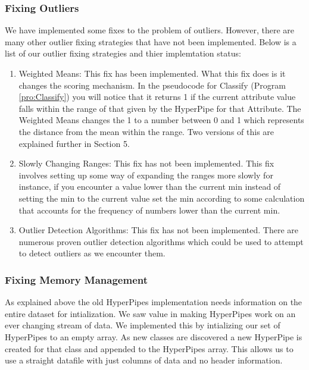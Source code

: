 \subsubsection{Fixing Outliers}
We have implemented some fixes to the problem of outliers. 
However, there are many other outlier fixing strategies that have 
not been implemented. Below is a list of our outlier fixing 
strategies and thier implemtation status:
\begin{enumerate}
\item Weighted Means: This fix has been implemented. What this fix 
does is it changes the scoring mechanism. In the pseudocode for 
Classify (Program \ref{pro:Classify}) you will notice that it returns 1 if the current attribute 
value falls within the range of that given by the HyperPipe for that 
Attribute. The Weighted Means changes the 1 to a number between 0 
and 1 which represents the distance from the mean within the range. 
Two versions of this are explained further in Section 5.
\item Slowly Changing Ranges: This fix has not been implemented. 
This fix involves setting up some way of expanding the ranges more 
slowly for instance, if you encounter a value lower than the current 
min instead of setting the min to the current value set the min 
according to some calculation that accounts for the frequency of 
numbers lower than the current min.
\item Outlier Detection Algorithms: This fix has not been implemented. 
There are numerous proven outlier detection algorithms which could be 
used to attempt to detect outliers as we encounter them.
\end{enumerate}


\subsubsection{Fixing Memory Management}
As explained above the old HyperPipes implementation needs information 
on the entire dataset for intialization. We saw value in making 
HyperPipes work on an ever changing stream of data. We implemented this 
by intializing our set of HyperPipes to an empty array. As new classes 
are discovered a new HyperPipe is created for that class and appended 
to the HyperPipes array. This allows us to use a straight datafile with 
just columns of data and no header information. 
